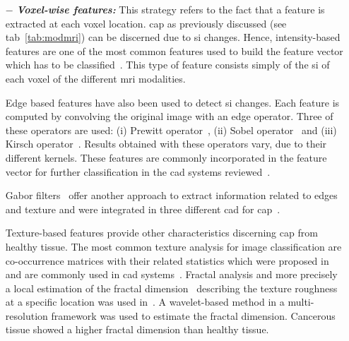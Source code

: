 \begin{enumerate}[leftmargin=*]

\item[$-$] \textbf{\textit{Voxel-wise features:}} This strategy refers to the fact that a feature is extracted at each voxel location. \ac{cap} as previously discussed (see \ac{tab}~\ref{tab:modmri}) can be discerned due to \ac{si} changes. Hence, intensity-based features are one of the most common features used to build the feature vector which has to be classified~\cite{Ampeliotis2007,Ampeliotis2008,Artan2009,Artan2010,Chan2003,Langer2009,Litjens2011,Litjens2012,Litjens2014,Liu2009,Niaf2011,Niaf2012,Viswanath2008a,Viswanath2011}. This type of feature consists simply of the \ac{si} of each voxel of the different \ac{mri} modalities.

Edge based features have also been used to detect \Ac{si} changes. Each feature is computed by convolving the original image with an edge operator. Three of these operators are used: (i) Prewitt operator~\cite{Prewitt1970}, (ii) Sobel operator~\cite{Sobel1970} and (iii) Kirsch operator~\cite{Kirsch1971}. Results obtained with these operators vary, due to their different kernels. These features are commonly incorporated in the feature vector for further classification in the \ac{cad} systems reviewed~\cite{Niaf2011,Niaf2012,Tiwari2009a,Tiwari2010,Tiwari2013,Viswanath2008,Viswanath2011}.

  Gabor filters~\cite{Gabor1946,Daugman1985} offer another approach to extract information related to edges and texture and were integrated in three different \ac{cad} for \ac{cap}~\cite{Viswanath2008a,Viswanath2012,Tiwari2012}.
  
  Texture-based features provide other characteristics discerning \ac{cap} from healthy tissue. The most common texture analysis for image classification are co-occurrence matrices with their related statistics which were proposed in~\cite{Haralick1973} and are commonly used in \ac{cad} systems~\cite{Antic2013,Niaf2011,Niaf2012,Tiwari2009a,Tiwari2010,Tiwari2013,Viswanath2008,Viswanath2008a,Viswanath2011,Viswanath2012}.
  Fractal analysis and more precisely a local estimation of the fractal dimension~\cite{Benassi1998} describing the texture roughness at a specific location was used in~\cite{Lopes2011}. A wavelet-based method in a multi-resolution framework was used to estimate the fractal dimension. Cancerous tissue showed a higher fractal dimension than healthy tissue.


\end{enumerate}
